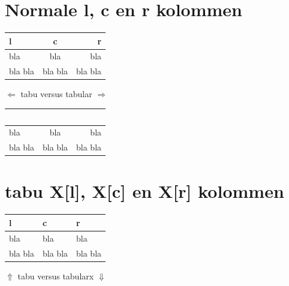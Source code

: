 \newcommand{\myClass}{article}

\usepackage{array}
\usepackage{tabularx}
\usepackage{tabulary}
\usepackage{colortbl}
\renewcommand\arraystretch{1.4}
\usepackage{siunitx}

\newcommand{\lt}{Dit is een langere tekst om te kijken hoe die in een tabel wordt weergegeven.}



\section{Normale l, c en r kolommen}
\begin{tabu}{|lcr|}
	\hline
	\rowfont[c]{\bfseries\color{white}}
 	l & c & r \\ \hline
	bla & bla & bla\\
	bla bla & bla bla & bla bla \\ \hline
\end{tabu} $\Leftarrow$ tabu versus tabular $\Rightarrow$ %
\begin{tabular}{|lcr|}
	\arrayrulecolor{hrred}
	\hline
	\rowcolor{hrred}\multicolumn{1}{|c}{\textbf{\textcolor{white}{l}}} & \multicolumn{1}{c}{\textbf{\textcolor{white}{c}}} & \multicolumn{1}{c|}{\textbf{\textcolor{white}{r}}} \\ \hline
	bla & bla & bla\\
	bla bla & bla bla & bla bla \\ \hline
\end{tabular}%

\section{tabu X[l], X[c] en X[r] kolommen}
\begin{tabu}{|X[l]X[c]X[r]|}
	\hline
	\rowfont[c]{\bfseries\color{white}}
 	l & c & r \\ \hline
	bla & bla & bla\\
	bla bla & bla bla & bla bla \\ \hline
\end{tabu} 
$\Uparrow$ tabu versus tabularx $\Downarrow$

